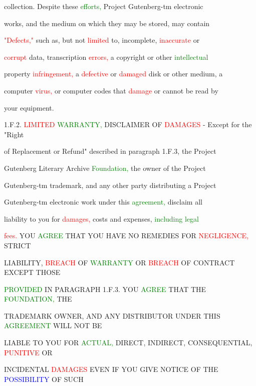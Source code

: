  collection. Despite these \textcolor{green}{efforts,} Project Gutenberg-tm electronic

 works, and the medium on which they may be \textcolor{BurntOrange}{stored,} may contain

 \textcolor{red}{"Defects,"} such as, but not \textcolor{red}{limited} to, incomplete, \textcolor{red}{inaccurate} or

 \textcolor{red}{corrupt} data, transcription \textcolor{red}{errors,} a copyright or other \textcolor{green}{intellectual}

 property \textcolor{red}{infringement,} a \textcolor{red}{defective} or \textcolor{red}{damaged} disk or other medium, a

 computer \textcolor{red}{virus,} or computer codes that \textcolor{red}{damage} or cannot be read by

 your equipment.



 1.F.2. \textcolor{red}{LIMITED} \textcolor{green}{WARRANTY,} DISCLAIMER OF \textcolor{red}{DAMAGES} - Except for the "Right

 of Replacement or Refund" described in paragraph 1.F.3, the Project

 Gutenberg Literary Archive \textcolor{green}{Foundation,} the owner of the Project

 Gutenberg-tm trademark, and any other party distributing a Project

 Gutenberg-tm electronic work under this \textcolor{green}{agreement,} \textcolor{BurntOrange}{disclaim} all

 liability to you for \textcolor{red}{damages,} costs and expenses, \textcolor{green}{including} \textcolor{green}{legal}

 \textcolor{red}{fees.} YOU \textcolor{green}{AGREE} THAT YOU HAVE NO \textcolor{BurntOrange}{REMEDIES} FOR \textcolor{red}{NEGLIGENCE,} STRICT

 LIABILITY, \textcolor{red}{BREACH} OF \textcolor{green}{WARRANTY} OR \textcolor{red}{BREACH} OF CONTRACT EXCEPT THOSE

 \textcolor{green}{PROVIDED} IN PARAGRAPH 1.F.3. YOU \textcolor{green}{AGREE} THAT THE \textcolor{green}{FOUNDATION,} THE

 TRADEMARK OWNER, AND ANY DISTRIBUTOR UNDER THIS \textcolor{green}{AGREEMENT} WILL NOT BE

 LIABLE TO YOU FOR \textcolor{green}{ACTUAL,} DIRECT, INDIRECT, CONSEQUENTIAL, \textcolor{red}{PUNITIVE} OR

 INCIDENTAL \textcolor{red}{DAMAGES} EVEN IF YOU GIVE NOTICE OF THE \textcolor{blue}{POSSIBILITY} OF SUCH

